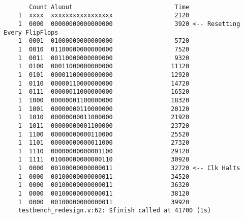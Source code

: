 \documentclass[../main]{subfiles}
\begin{document}
\begin{verbatim}

       Count Aluout                            Time
    1  xxxx  xxxxxxxxxxxxxxxxx                 2120
    1  0000  00000000000000000                 3920 <-- Resetting Every FlipFlops
    1  0001  01000000000000000                 5720
    1  0010  01100000000000000                 7520
    1  0011  00110000000000000                 9320
    1  0100  00011000000000000                11120
    1  0101  00001100000000000                12920
    1  0110  00000110000000000                14720
    1  0111  00000011000000000                16520
    1  1000  00000001100000000                18320
    1  1001  00000000110000000                20120
    1  1010  00000000011000000                21920
    1  1011  00000000001100000                23720
    1  1100  00000000000110000                25520
    1  1101  00000000000011000                27320
    1  1110  00000000000001100                29120
    1  1111  01000000000000110                30920
    1  0000  00100000000000011                32720 <-- Clk Halts
    1  0000  00100000000000011                34520
    1  0000  00100000000000011                36320
    1  0000  00100000000000011                38120
    1  0000  00100000000000011                39920
    testbench_redesign.v:62: $finish called at 41700 (1s)

\end{verbatim}
\end{document}
